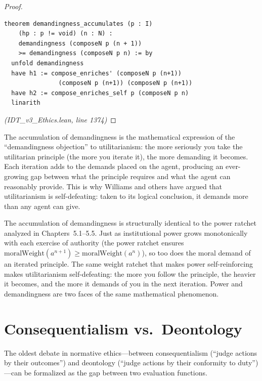 \begin{proof}
\begin{lstlisting}
theorem demandingness_accumulates (p : I)
    (hp : p != void) (n : N) :
    demandingness (composeN p (n + 1))
    >= demandingness (composeN p n) := by
  unfold demandingness
  have h1 := compose_enriches' (composeN p (n+1))
               (composeN p (n+1)) (composeN p (n+1))
  have h2 := compose_enriches_self p (composeN p n)
  linarith
\end{lstlisting}
\textit{(IDT\_v3\_Ethics.lean, line 1374)}
\end{proof}

\begin{interpretation}
The accumulation of demandingness is the mathematical expression of the
``demandingness objection'' to utilitarianism: the more seriously you take the
utilitarian principle (the more you iterate it), the more demanding it becomes.
Each iteration adds to the demands placed on the agent, producing an ever-growing
gap between what the principle requires and what the agent can reasonably provide.
This is why Williams and others have argued that utilitarianism is self-defeating:
taken to its logical conclusion, it demands more than any agent can give.
\end{interpretation}

\begin{remark}
The accumulation of demandingness is structurally identical to the power
ratchet analyzed in Chapters~5.1--5.5. Just as institutional power grows
monotonically with each exercise of authority (the power ratchet ensures
$\mathrm{moralWeight}(a^{n+1}) \geq \mathrm{moralWeight}(a^n)$), so too
does the moral demand of an iterated principle. The same weight ratchet
that makes power self-reinforcing makes utilitarianism self-defeating:
the more you follow the principle, the heavier it becomes, and the more
it demands of you in the next iteration. Power and demandingness are
two faces of the same mathematical phenomenon.
\end{remark}

\section{Consequentialism vs.\ Deontology}
\label{sec:consequentialism-deontology}

The oldest debate in normative ethics---between consequentialism (``judge
actions by their outcomes'') and deontology (``judge actions by their
conformity to duty'')---can be formalized as the gap between two
evaluation functions.

